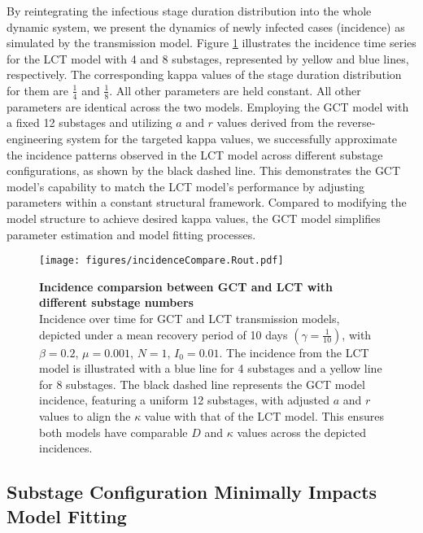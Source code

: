 \documentclass[12pt]{article}
\begin{document}
By reintegrating the infectious stage duration distribution into the whole dynamic system, we present the dynamics of newly infected cases (incidence) as simulated by the transmission model. Figure \ref{incidenceCompare} illustrates the incidence time series for the LCT model with 4 and 8 substages, represented by yellow and blue lines, respectively. The corresponding kappa values of the stage duration distribution for them are $\frac{1}{4}$ and $\frac{1}{8}$. All other parameters are held constant. All other parameters are identical across the two models. Employing the GCT model with a fixed 12 substages and utilizing $a$ and $r$ values derived from the reverse-engineering system for the targeted kappa values, we successfully approximate the incidence patterns observed in the LCT model across different substage configurations, as shown by the black dashed line. This demonstrates the GCT model's capability to match the LCT model's performance by adjusting parameters within a constant structural framework. Compared to modifying the model structure to achieve desired kappa values, the GCT model simplifies parameter estimation and model fitting processes. 

\begin{figure}[h!]
    \centering
    \texttt{[image: figures/incidenceCompare.Rout.pdf]}
    \caption{\textbf{Incidence comparsion between GCT and LCT with different substage numbers} \\ Incidence over time for GCT and LCT transmission models, depicted under a mean recovery period of 10 days $(\gamma = \frac{1}{10})$, with $\beta=0.2$, $\mu=0.001$, $N=1$, $I_0=0.01$. The incidence from the LCT model is illustrated with a blue line for 4 substages and a yellow line for 8 substages. The black dashed line represents the GCT model incidence, featuring a uniform 12 substages, with adjusted $a$ and $r$ values to align the $\kappa$ value with that of the LCT model. This ensures both models have comparable $D$ and $\kappa$ values across the depicted incidences.}
    \label{incidenceCompare}
\end{figure}


\subsection{Substage Configuration Minimally Impacts Model Fitting}
\end{document}

